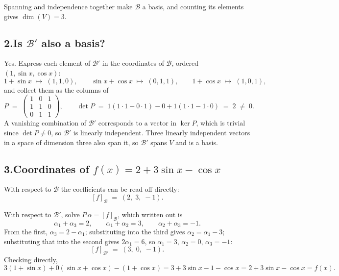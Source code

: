 \documentclass[11pt]{article}
\theoremstyle{definition}\newtheorem*{definition}{Definition}
\theoremstyle{definition}
\begin{document}
Spanning and independence together make $\mathcal{B}$ a basis, and
counting its elements gives $\dim(V) = 3$.

\subsection*{2.\quad Is $\mathcal{B}'$ also a basis?}

Yes. Express each element of $\mathcal{B}'$ in the coordinates of
$\mathcal{B}$, ordered $(1, \sin x, \cos x)$:
\[
  1 + \sin x \;\mapsto\; (1,1,0), \qquad
  \sin x + \cos x \;\mapsto\; (0,1,1), \qquad
  1 + \cos x \;\mapsto\; (1,0,1),
\]
and collect them as the columns of
\[
  P \;=\;
  \begin{pmatrix}
    1 & 0 & 1 \\
    1 & 1 & 0 \\
    0 & 1 & 1
  \end{pmatrix},
  \qquad
  \det P \;=\; 1(1 \cdot 1 - 0 \cdot 1) - 0 + 1(1 \cdot 1 - 1 \cdot 0)
  \;=\; 2 \;\ne\; 0 .
\]
A vanishing combination of $\mathcal{B}'$ corresponds to a vector in
$\ker P$, which is trivial since $\det P \ne 0$, so $\mathcal{B}'$ is
linearly independent. Three linearly independent vectors in a space of
dimension three also span it, so $\mathcal{B}'$ spans $V$ and is a basis.

\subsection*{3.\quad Coordinates of $f(x) = 2 + 3\sin x - \cos x$}

With respect to $\mathcal{B}$ the coefficients can be read off
directly:
\[
  [f]_{\mathcal{B}} \;=\; (2,\; 3,\; -1) .
\]

With respect to $\mathcal{B}'$, solve $P\,\alpha = [f]_{\mathcal{B}}$,
which written out is
\[
  \alpha_1 + \alpha_3 = 2, \qquad
  \alpha_1 + \alpha_2 = 3, \qquad
  \alpha_2 + \alpha_3 = -1 .
\]
From the first, $\alpha_3 = 2 - \alpha_1$; substituting into the third
gives $\alpha_2 = \alpha_1 - 3$; substituting that into the second gives
$2\alpha_1 = 6$, so $\alpha_1 = 3$, $\alpha_2 = 0$, $\alpha_3 = -1$:
\[
  [f]_{\mathcal{B}'} \;=\; (3,\; 0,\; -1) .
\]
Checking directly,
\[
  3(1 + \sin x) + 0(\sin x + \cos x) - (1 + \cos x)
  = 3 + 3\sin x - 1 - \cos x
  = 2 + 3\sin x - \cos x = f(x) .
\]

\end{document}
